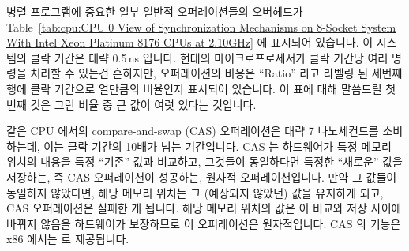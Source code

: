 병렬 프로그램에 중요한 일부 일반적 오퍼레이션들의 오버헤드가
Table~\ref{tab:cpu:CPU 0 View of Synchronization Mechanisms on 8-Socket System With Intel Xeon Platinum 8176 CPUs at 2.10GHz}
에 표시되어 있습니다.
이 시스템의 클락 기간은 대략 0.5\,ns 입니다.
현대의 마이크로프로세서가 클락 기간당 여러 명령을 처리할 수 있는건 흔하지만,
오퍼레이션의 비용은 ``Ratio'' 라고 라벨링 된 세번째 행에 클락 기간으로
얼만큼의 비율인지 표시되어 있습니다.
이 표에 대해 말씀드릴 첫번째 것은 그런 비율 중 큰 값이 여럿 있다는 것입니다.

같은 CPU 에서의 compare-and-swap (CAS) 오퍼레이션은 대략 7 나노세컨드를
소비하는데, 이는 클락 기간의 10배가 넘는 기간입니다.
CAS 는 하드웨어가 특정 메모리 위치의 내용을 특정 ``기존'' 값과 비교하고,
그것들이 동일하다면 특정한 ``새로운'' 값을 저장하는, 즉 CAS 오퍼레이션이
성공하는, 원자적 오퍼레이션입니다.
만약 그 값들이 동일하지 않았다면, 해당 메모리 위치는 그 (예상되지 않았던) 값을
유지하게 되고, CAS 오퍼레이션은 실패한 게 됩니다.
해당 메모리 위치의 값은 이 비교와 저장 사이에 바뀌지 않음을 하드웨어가
보장하므로 이 오퍼레이션은 원자적입니다.
CAS 의 기능은 x86 에서는  로 제공됩니다.

